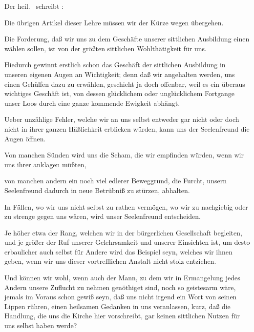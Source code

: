 Der heil.\  schreibt :  \usw\par
Die übrigen Artikel dieser Lehre müssen wir der Kürze wegen übergehen.

\begin{aufza}
\item Die Forderung, daß wir uns zu dem Geschäfte unserer sittlichen Ausbildung einen  wählen sollen, ist von der größten sittlichen Wohlthätigkeit für uns.
\begin{aufzb}
\item Hiedurch gewinnt erstlich schon das Geschäft der sittlichen Ausbildung in unseren eigenen Augen an Wichtigkeit; denn daß wir angehalten werden, uns einen Gehülfen dazu zu erwählen, geschieht ja doch offenbar, weil es ein überaus wichtiges Geschäft ist, von dessen glücklichem oder unglücklichem Fortgange unser Loos durch eine ganze kommende Ewigkeit abhängt.
\item Ueber unzählige Fehler, welche wir an uns selbst entweder gar nicht oder doch nicht in ihrer ganzen Häßlichkeit erblicken würden, kann uns der Seelenfreund die Augen öffnen.
\item Von manchen Sünden wird uns die Scham, die wir empfinden würden, wenn wir uns ihrer anklagen müßten,
\item von manchen andern ein noch viel edlerer Beweggrund, die Furcht, unsern Seelenfreund dadurch in neue Betrübniß zu stürzen, abhalten.
\item In Fällen, wo wir uns nicht selbst zu rathen vermögen, wo wir zu nachgiebig oder zu strenge gegen uns wären, wird unser Seelenfreund entscheiden.
\item Je höher etwa der Rang, welchen wir in der bürgerlichen Gesellschaft begleiten, und je größer der Ruf unserer Gelehrsamkeit und unserer Einsichten ist, um desto erbaulicher auch selbst für Andere wird das Beispiel seyn, welches wir ihnen geben, wenn wir uns dieser vortrefflichen Anstalt nicht stolz entziehen.
\item Und können wir wohl, wenn auch der Mann, zu dem wir in Ermangelung jedes Andern unsere Zuflucht zu nehmen genöthiget sind, noch so geistesarm wäre, jemals im Voraus schon gewiß seyn, daß uns nicht irgend ein Wort von seinen Lippen rühren, einen heilsamen Gedanken in uns veranlassen, kurz, daß die Handlung, die uns die Kirche hier vorschreibt, gar keinen sittlichen Nutzen für uns selbst haben werde?

\end{aufzb}
\end{aufza}
